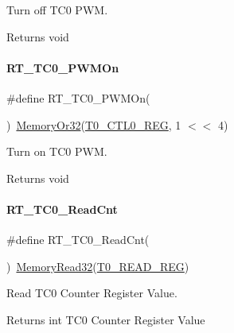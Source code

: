 Turn off T\+C0 P\+WM. 

\begin{DoxyReturn}{Returns}
void 
\end{DoxyReturn}
\mbox{\label{a00041_a70e69675d0a4e7d5095f938dffa14779}} 
\paragraph{\texorpdfstring{R\+T\+\_\+\+T\+C0\+\_\+\+P\+W\+M\+On}{RT\_TC0\_PWMOn}}
{\footnotesize\ttfamily \#define R\+T\+\_\+\+T\+C0\+\_\+\+P\+W\+M\+On(\begin{DoxyParamCaption}{ }\end{DoxyParamCaption})~\mbox{\hyperlink{a00020_a27874a97deab7cecdde5ddecf466e31e}{Memory\+Or32}}(\mbox{\hyperlink{a00020_ac94b0659ef32086a6752672082c0b3ed}{T0\+\_\+\+C\+T\+L0\+\_\+\+R\+EG}}, 1 $<$$<$ 4)}



Turn on T\+C0 P\+WM. 

\begin{DoxyReturn}{Returns}
void 
\end{DoxyReturn}
\mbox{\label{a00041_acd97abf7aebb4ffa83af031604a67344}} 
\paragraph{\texorpdfstring{R\+T\+\_\+\+T\+C0\+\_\+\+Read\+Cnt}{RT\_TC0\_ReadCnt}}
{\footnotesize\ttfamily \#define R\+T\+\_\+\+T\+C0\+\_\+\+Read\+Cnt(\begin{DoxyParamCaption}{ }\end{DoxyParamCaption})~\mbox{\hyperlink{a00020_a2d484dc15bdf30ee11ab3b05f31f0e16}{Memory\+Read32}}(\mbox{\hyperlink{a00020_a277152b8a3150eb5ae1201205e2778fb}{T0\+\_\+\+R\+E\+A\+D\+\_\+\+R\+EG}})}



Read T\+C0 Counter Register Value. 

\begin{DoxyReturn}{Returns}
int T\+C0 Counter Register Value 
\end{DoxyReturn}
\mbox{\label{a00041_ac299997dc05f47b4b42bfd4e52b98d36}} 
